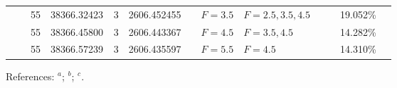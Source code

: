 \begin{table*}
\begin{center}
{\begin{tabular}{:l;l;c;l;c;l;c;l;l;c;c;c;c}
\rowstyle{\itshape}               &        & 55        & 38366.32423$^{}$                 & 3 &   2606.452455      &      & $F=3.5                                   $ & $F=2.5,3.5,4.5                           $ & $      $ &              & 19.052\%  & $          $\\
\rowstyle{\itshape}               &        & 55        & 38366.45800$^{}$                 & 3 &   2606.443367      &      & $F=4.5                                   $ & $F=3.5,4.5                               $ & $      $ &              & 14.282\%  & $          $\\
\rowstyle{\itshape}               &        & 55        & 38366.57239$^{}$                 & 3 &   2606.435597      &      & $F=5.5                                   $ & $F=4.5                                   $ & $      $ &              & 14.310\%  & $          $\\
\hline
\end{tabular}
}
{\footnotesize References:
$^{a}$\citet{Aldenius:2009:014008};
$^{b}$\citet{Blackwell-Whitehead:2005:705};
$^{c}$\citet{Nave:2012:1570}.}
\end{center}
\end{table*}
